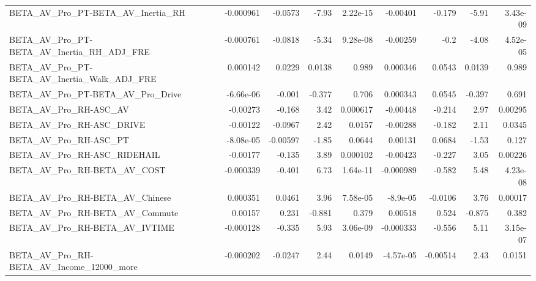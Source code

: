 \begin{tabular}{lrrrrrrrr}
BETA\_AV\_Pro\_PT-BETA\_AV\_Inertia\_RH                  &   -0.000961 &      -0.0573 &    -7.93 & 2.22e-15 &   -0.00401 &      -0.179 &        -5.91 &      3.43e-09 \\
BETA\_AV\_Pro\_PT-BETA\_AV\_Inertia\_RH\_ADJ\_FRE          &   -0.000761 &      -0.0818 &    -5.34 & 9.28e-08 &   -0.00259 &        -0.2 &        -4.08 &      4.52e-05 \\
BETA\_AV\_Pro\_PT-BETA\_AV\_Inertia\_Walk\_ADJ\_FRE        &    0.000142 &       0.0229 &   0.0138 &    0.989 &   0.000346 &      0.0543 &       0.0139 &         0.989 \\
BETA\_AV\_Pro\_PT-BETA\_AV\_Pro\_Drive                   &   -6.66e-06 &       -0.001 &   -0.377 &    0.706 &   0.000343 &      0.0545 &       -0.397 &         0.691 \\
BETA\_AV\_Pro\_RH-ASC\_AV                              &    -0.00273 &       -0.168 &     3.42 & 0.000617 &   -0.00448 &      -0.214 &         2.97 &       0.00295 \\
BETA\_AV\_Pro\_RH-ASC\_DRIVE                           &    -0.00122 &      -0.0967 &     2.42 &   0.0157 &   -0.00288 &      -0.182 &         2.11 &        0.0345 \\
BETA\_AV\_Pro\_RH-ASC\_PT                              &   -8.08e-05 &     -0.00597 &    -1.85 &   0.0644 &    0.00131 &      0.0684 &        -1.53 &         0.127 \\
BETA\_AV\_Pro\_RH-ASC\_RIDEHAIL                        &    -0.00177 &       -0.135 &     3.89 & 0.000102 &   -0.00423 &      -0.227 &         3.05 &       0.00226 \\
BETA\_AV\_Pro\_RH-BETA\_AV\_COST                        &   -0.000339 &       -0.401 &     6.73 & 1.64e-11 &  -0.000989 &      -0.582 &         5.48 &      4.23e-08 \\
BETA\_AV\_Pro\_RH-BETA\_AV\_Chinese                     &    0.000351 &       0.0461 &     3.96 & 7.58e-05 &   -8.9e-05 &     -0.0106 &         3.76 &       0.00017 \\
BETA\_AV\_Pro\_RH-BETA\_AV\_Commute                     &     0.00157 &        0.231 &   -0.881 &    0.379 &    0.00518 &       0.524 &       -0.875 &         0.382 \\
BETA\_AV\_Pro\_RH-BETA\_AV\_IVTIME                      &   -0.000128 &       -0.335 &     5.93 & 3.06e-09 &  -0.000333 &      -0.556 &         5.11 &      3.15e-07 \\
BETA\_AV\_Pro\_RH-BETA\_AV\_Income\_12000\_more           &   -0.000202 &      -0.0247 &     2.44 &   0.0149 &  -4.57e-05 &    -0.00514 &         2.43 &        0.0151 \\

\end{tabular}
